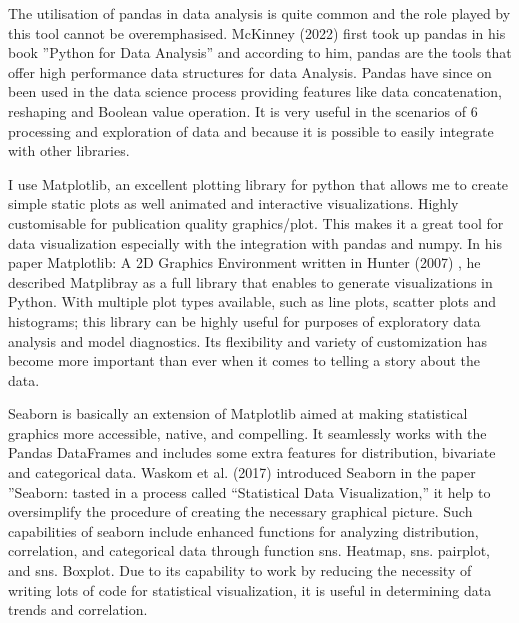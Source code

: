\documentclass[12pt, a4paper,oneside]{book}
\numberwithin{equation}{section}
\begin{document}
The utilisation of pandas in data analysis is quite common and the role played by this tool cannot be overemphasised. McKinney (2022) \cite{mckinney2022python} first took up pandas in his book ”Python for Data Analysis” and according to him, pandas are the tools that offer high performance data structures for data Analysis. Pandas have since on been used in the data science process providing features like data concatenation, reshaping and Boolean value operation. It is very useful in the scenarios of 6 processing and exploration of data and because it is possible to easily integrate with other libraries. 

\vspace{7mm}
I use Matplotlib, an excellent plotting library for python that allows me to create simple static plots as well animated and interactive visualizations. Highly customisable for publication quality graphics/plot. This makes it a great tool for data visualization especially with the integration with pandas and numpy. In his paper Matplotlib: A 2D Graphics Environment written in Hunter (2007) \cite{hunter2007matplotlib}, he described Matplibray as a full library that enables to generate visualizations in Python. With multiple plot types available, such as line plots, scatter plots and histograms; this library can be highly useful for purposes of exploratory data analysis and model diagnostics. Its flexibility and variety of customization has become more important than ever when it comes to telling a story about the data.

Seaborn is basically an extension of Matplotlib aimed at making statistical graphics more accessible, native, and compelling. It seamlessly works with the Pandas DataFrames and includes some extra features for distribution, bivariate and categorical data. Waskom et al. (2017) \cite{waskom2017seaborn} introduced Seaborn in the paper ”Seaborn: tasted in a process called “Statistical Data Visualization,” it help to oversimplify the procedure of creating the necessary graphical picture. Such capabilities of seaborn include enhanced functions for analyzing distribution, correlation, and categorical data through function sns. Heatmap, sns. pairplot, and sns. Boxplot. Due to its capability to work by reducing the necessity of writing lots of code for statistical visualization, it is useful in determining data trends and correlation. 
\end{document}
